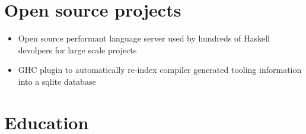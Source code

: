 \documentclass{simple_resume}
\begin{document}
\section{Open source projects}
\begin{itemize}
  \item Open source performant language server used by hundreds of Haskell devolpers for large scale projects
\end{itemize}
\begin{itemize}
  \item GHC plugin to automatically re-index compiler generated tooling information into a sqlite database
\end{itemize}

%

\section{Education}

\end{document}
